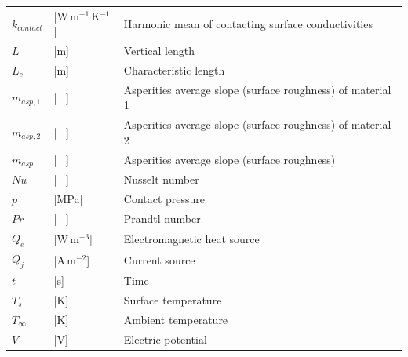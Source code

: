 \documentclass[review,times,sagev,doublespace]{sagej}
\begin{document}
\begin{longtable*}[c]{p{2cm} p{2cm} l}
		$k_{contact}$ 		& [W\,m$^{-1}$\,K$^{-1}$] 	& Harmonic mean of contacting surface conductivities          \\
		$L$ 				& [m] 						& Vertical length                                             \\
		$L_c$ 				& [m] 						& Characteristic length                                       \\
		$m_{asp,1}$ 		& [ \ ] 					& Asperities average slope (surface roughness) of material 1  \\
		$m_{asp,2}$ 		& [ \ ] 					& Asperities average slope (surface roughness) of material 2  \\
		$m_{asp}$ 			& [ \ ] 					& Asperities average slope (surface roughness)                \\
		$Nu$ 				& [ \ ] 					& Nusselt number                                              \\
		$p$ 				& [MPa] 					& Contact pressure                                            \\
		$Pr$ 				& [ \ ] 					& Prandtl number                                              \\
		$Q_e$ 				& [W\,m$^{-3}$] 			& Electromagnetic heat source                                 \\
		$Q_j$ 				& [A\,m$^{-2}$] 			& Current source                                              \\
		$t$ 				& [s] 						& Time                                                        \\
		$T_s$ 				& [K] 						& Surface temperature                                         \\
		$T_{\infty}$ 		& [K] 						& Ambient temperature                                         \\
		$V$ 				& [V] 						& Electric potential                                         
\end{longtable*}




\end{document}

